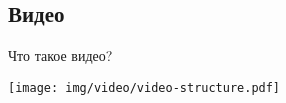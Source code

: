 

\subsection{Видео}

\begin{frame}{Что такое видео?}
    \begin{center}
        \texttt{[image: img/video/video-structure.pdf]}
    \end{center}
\end{frame}
